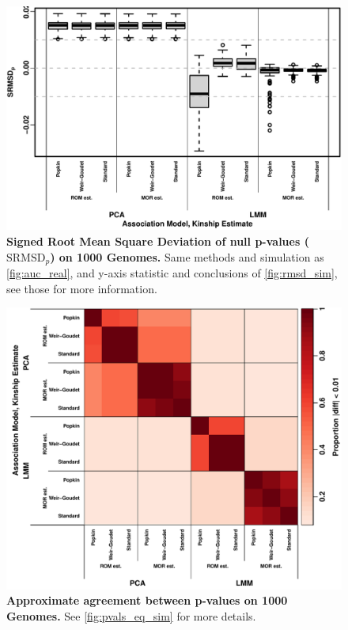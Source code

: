\documentclass[11pt]{article}
\newcommand{\rmsd}{\text{SRMSD}_p}
\begin{document}
\begin{figure}[hp!]
  \centering
  \includegraphics[width=\textwidth]{tgp-nygc-autosomes_ld_prune_1000kb_0.3_maf-0.01/rmsd.pdf}
  \caption{
    {\bf Signed Root Mean Square Deviation of null p-values ($\rmsd$) on 1000 Genomes.}
    Same methods and simulation as \cref{fig:auc_real}, and y-axis statistic and conclusions of \cref{fig:rmsd_sim}, see those for more information.
  }
  \label{fig:rmsd_real}
\end{figure}

\begin{figure}[bp!]
  \centering
  \includegraphics[width=\textwidth]{tgp-nygc-autosomes_ld_prune_1000kb_0.3_maf-0.01/pvals_eq.pdf}
  \caption{
    {\bf Approximate agreement between p-values on 1000 Genomes.}
    See \cref{fig:pvals_eq_sim} for more details.
  }
  \label{fig:pvals_eq_real}
\end{figure}
\end{document}
